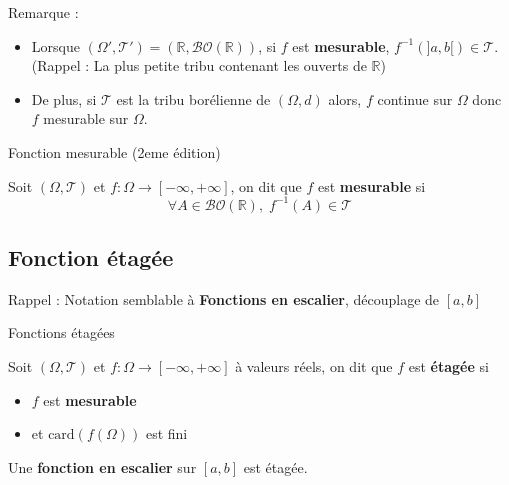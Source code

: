 Remarque : 
\begin{itemize}

    \item Lorsque $(\Omega', \mathcal{T}')= (\mathbb{R}, \mathcal{BO}(\mathbb{R}))$, si $f$ est \textbf{mesurable}, $f ^{-1}(]a,b[) \in \mathcal{T}$. (Rappel : La plus petite tribu contenant les ouverts de $\mathbb{R}$)
    \item De plus, si $\mathcal{T}$ est la tribu borélienne de $(\Omega, d)$ alors, $f$ continue sur $\Omega$ donc $f$ mesurable sur $\Omega$.

\end{itemize}
\begin{Definition}[colbacktitle=red!75!black]{Fonction mesurable (2eme édition)}{}

  
Soit $(\Omega, \mathcal{T})$ et $f : \Omega \to [-\infty, + \infty]$, on dit que $f$ est \textbf{mesurable} si 
\begin{equation}
  \forall A \in \mathcal{BO}(\mathbb{R}),\; f ^{-1}(A) \in \mathcal{T}
\end{equation}
\end{Definition}

\subsection{Fonction étagée} %
\label{sub:Fonction étagée}

\begin{note}{}{}
  Rappel : Notation semblable à \textbf{Fonctions en escalier}, découplage de $[a,b]$
\end{note}
\begin{Definition}[colbacktitle=red!75!black]{Fonctions étagées}{}

Soit $(\Omega, \mathcal{T})$ et $f : \Omega \to [-\infty, + \infty]$ à valeurs réels, on dit que $f$ est \textbf{étagée} si 
\begin{itemize}

    \item $f$ est \textbf{mesurable}
    \item et $\mathrm{card}(f(\Omega))$ est fini

\end{itemize}
\end{Definition}

\begin{Prop}{}{}
  Une \textbf{fonction en escalier} sur $[a,b]$ est étagée.
\end{Prop}

